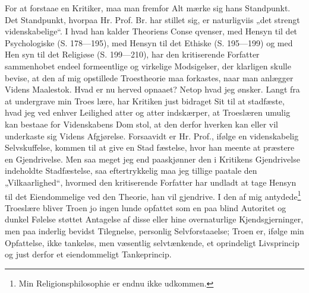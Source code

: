 \documentclass[12pt]{book}
\newcommand{\opage}[1]{\marginnote{\footnotesize\textit{[#1]}}}
\begin{document}
For at forstaae en Kritiker, maa man fremfor Alt
mærke sig hans Standpunkt. Det Standpunkt, hvorpaa
Hr. Prof. Br. har stillet sig, er naturligviis „det strengt
videnskabelige“. I hvad han kalder Theoriens Conse\-%
qvenser, med Hensyn til det Psychologiske (S. 178---195),
med Hensyn til det Ethiske (S. 195---199) og med Hen\-%
syn til det Religiøse (S. 199---210), har den kritiserende
Forfatter sammenhobet endeel formeentlige og virkelige
\opage{4}\setcounter{footnote}{0}%
Modsigelser, der klarligen skulle bevise, at den af mig
opstillede Troestheorie maa forkastes, naar man anlægger
Videns Maalestok. Hvad er nu herved opnaaet? Netop
hvad jeg ønsker. Langt fra at undergrave min Troes\-%
lære, har Kritiken just bidraget Sit til at stadfæste, hvad
jeg ved enhver Leilighed atter og atter indskærper, at
Troeslæren umulig kan bestaae for Videnskabens Dom\-%
stol, at den derfor hverken kan eller vil underkaste sig
Videns Afgjørelse. Forsaavidt er Hr. Prof., ifølge en
videnskabelig Selvskuffelse, kommen til at give en Stad\-%
fæstelse, hvor han meente at præstere en Gjendrivelse.
Men saa meget jeg end paaskjønner den i Kritikens
Gjendrivelse indeholdte Stadfæstelse, saa eftertrykkelig
maa jeg tillige paatale den „Vilkaarlighed“, hvormed den
kritiserende Forfatter har undladt at tage Hensyn til det
Eiendommelige ved den Theorie, han vil gjendrive. I
den af mig antydede\footnote{Min Religionsphilosophie er endnu ikke udkommen.}
Troeslære bliver Troen jo ingen\-%
lunde opfattet som en paa blind Autoritet og dunkel
Følelse støttet Antagelse af disse eller hine overnaturlige
Kjendsgjerninger, men paa inderlig bevidst Tilegnelse,
personlig Selvforstaaelse; Troen er, ifølge min Opfattelse,
ikke tankeløs, men væsentlig selvtænkende, et oprindeligt
Livsprincip og just derfor et eiendommeligt Tankeprincip.
\end{document}
